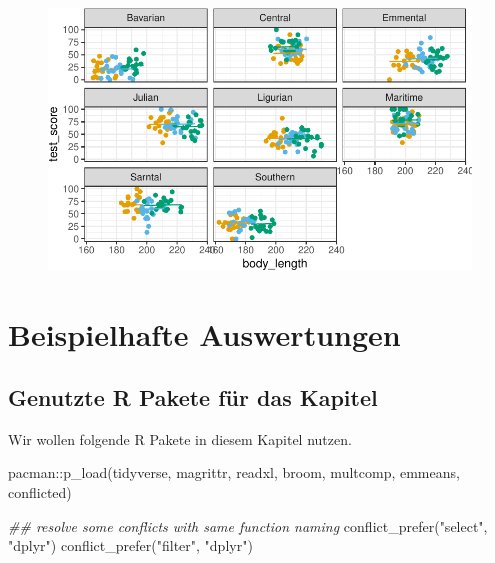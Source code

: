 \documentclass[
  letterpaper,
  DIV=11,
  oneside]{scrreport}
\newenvironment{Shaded}{\begin{snugshade}}{\end{snugshade}}
\newcommand{\DocumentationTok}[1]{\textcolor[rgb]{0.37,0.37,0.37}{\textit{#1}}}
\newcommand{\FunctionTok}[1]{\textcolor[rgb]{0.28,0.35,0.67}{#1}}
\newcommand{\NormalTok}[1]{\textcolor[rgb]{0.00,0.23,0.31}{#1}}
\newcommand{\SpecialCharTok}[1]{\textcolor[rgb]{0.37,0.37,0.37}{#1}}
\newcommand{\StringTok}[1]{\textcolor[rgb]{0.13,0.47,0.30}{#1}}
\begin{document}
\begin{figure}[H]

{\centering \includegraphics{./stat-modeling-mixed_files/figure-pdf/unnamed-chunk-17-1.pdf}

}

\end{figure}

\appendix
{}

\hypertarget{sec-beispiel-auswertung}{%
\chapter{Beispielhafte Auswertungen}\label{sec-beispiel-auswertung}}

\hypertarget{genutzte-r-pakete-fuxfcr-das-kapitel-12}{%
\section{Genutzte R Pakete für das
Kapitel}\label{genutzte-r-pakete-fuxfcr-das-kapitel-12}}

Wir wollen folgende R Pakete in diesem Kapitel nutzen.

\begin{Shaded}
\begin{Highlighting}[]
\NormalTok{pacman}\SpecialCharTok{::}\FunctionTok{p\_load}\NormalTok{(tidyverse, magrittr, readxl, }
\NormalTok{               broom, multcomp, emmeans, }
\NormalTok{               conflicted)}

\DocumentationTok{\#\# resolve some conflicts with same function naming}
\FunctionTok{conflict\_prefer}\NormalTok{(}\StringTok{"select"}\NormalTok{, }\StringTok{"dplyr"}\NormalTok{)}
\FunctionTok{conflict\_prefer}\NormalTok{(}\StringTok{"filter"}\NormalTok{, }\StringTok{"dplyr"}\NormalTok{)}
\end{Highlighting}
\end{Shaded}
\end{document}
